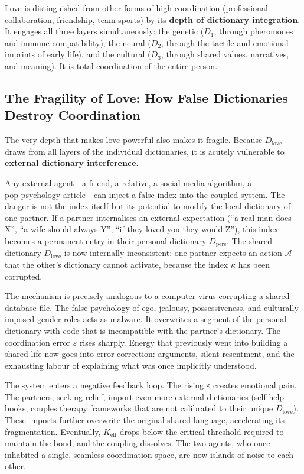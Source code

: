 \documentclass[12pt,a4paper]{article}
\begin{document}
	Love is distinguished from other forms of high coordination (professional collaboration, friendship, team sports) by its \textbf{depth of dictionary integration}. It engages all three layers simultaneously: the genetic (\(D_1\), through pheromones and immune compatibility), the neural (\(D_2\), through the tactile and emotional imprints of early life), and the cultural (\(D_3\), through shared values, narratives, and meaning). It is total coordination of the entire person.
	
	\subsection{The Fragility of Love: How False Dictionaries Destroy Coordination}
	
	The very depth that makes love powerful also makes it fragile. Because \(D_{\text{love}}\) draws from all layers of the individual dictionaries, it is acutely vulnerable to \textbf{external dictionary interference}.
	
	Any external agent—a friend, a relative, a social media algorithm, a pop‑psychology article—can inject a false index into the coupled system. The danger is not the index itself but its potential to modify the local dictionary of one partner. If a partner internalises an external expectation (``a real man does X'', ``a wife should always Y'', ``if they loved you they would Z''), this index becomes a permanent entry in their personal dictionary \(D_{\text{pers}}\). The shared dictionary \(D_{\text{love}}\) is now internally inconsistent: one partner expects an action \(\mathcal{A}\) that the other's dictionary cannot activate, because the index \(\kappa\) has been corrupted.
	
	The mechanism is precisely analogous to a computer virus corrupting a shared database file. The false psychology of ego, jealousy, possessiveness, and culturally imposed gender roles acts as malware. It overwrites a segment of the personal dictionary with code that is incompatible with the partner's dictionary. The coordination error \(\varepsilon\) rises sharply. Energy that previously went into building a shared life now goes into error correction: arguments, silent resentment, and the exhausting labour of explaining what was once implicitly understood.
	
	The system enters a negative feedback loop. The rising \(\varepsilon\) creates emotional pain. The partners, seeking relief, import even more external dictionaries (self‑help books, couples therapy frameworks that are not calibrated to their unique \(D_{\text{love}}\)). These imports further overwrite the original shared language, accelerating its fragmentation. Eventually, \(K_{\mathrm{eff}}\) drops below the critical threshold required to maintain the bond, and the coupling dissolves. The two agents, who once inhabited a single, seamless coordination space, are now islands of noise to each other.
	
\end{document}
